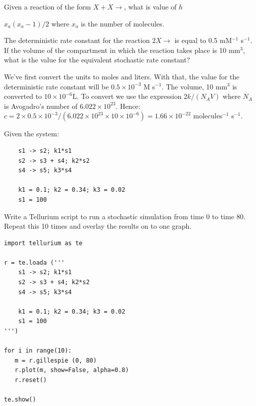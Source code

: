 \documentclass[12pt]{article}
\begin{document}
\begin{question}
Given a reaction of the form $X + X \rightarrow $, what is value of $h$
\end{question}
\begin{solution}
$x_a (x_a-1)/2$ where $x_a$ is the number of molecules.
\end{solution}


\begin{question}
The deterministic rate constant for the reaction $2 X \rightarrow $ is equal to 0.5 mM$^{-1}$ s$^{-1}$. If the volume of the compartment in which the reaction takes place is 10 mm$^3$, what is the value for the equivalent stochastic rate constant?
\end{question}
\begin{solution}
We've first convert the units to moles and liters. With that, the value for the deterministic rate constant will be $0.5 \times 10^{-3}$ M s$^{-1}$. The volume, 10 mm$^3$ is converted to $10 \times 10^{-6}$L. To convert we use the expression $2 k/ (N_A V)$ where $N_A$ is Avogadro's number of $6.022 \times 10^{23}$. Hence: $c = 2 \times 0.5 \times 10^{-3} /(6.022 \times 10^{23} \times 10 \times 10^{-6})  = 1.66 \times 10^{-22}$ molecules$^{-1}$ s$^{-1}$.
\end{solution}


\cprotEnv\begin{question}
Given the system:

\begin{verbatim}
    s1 -> s2; k1*s1
    s2 -> s3 + s4; k2*s2
    s4 -> s5; k3*s4

    k1 = 0.1; k2 = 0.34; k3 = 0.02
    s1 = 100
\end{verbatim}

Write a Tellurium script to run a stochastic simulation from time 0 to time 80. Repeat this 10 times and overlay the results on to one graph.
\end{question}
\cprotEnv\begin{solution}
\begin{verbatim}
import tellurium as te

r = te.loada ('''
    s1 -> s2; k1*s1
    s2 -> s3 + s4; k2*s2
    s4 -> s5; k3*s4

    k1 = 0.1; k2 = 0.34; k3 = 0.02
    s1 = 100
''')

for i in range(10):
   m = r.gillespie (0, 80)
   r.plot(m, show=False, alpha=0.8)
   r.reset()

te.show()
\end{verbatim}
\end{solution}
\end{document}
